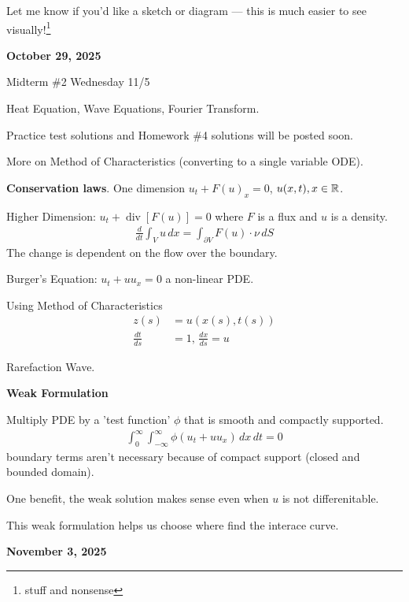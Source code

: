 \documentclass[12pt,a4paper]{report}
\begin{document}
Let me know if you'd like a sketch or diagram — this is much easier to see visually!\footnote{stuff and nonsense}{

\newpage
\textbf{\Large {October 29, 2025}}

\begin{description}
	\item Midterm \#2 Wednesday 11/5
	
	Heat Equation, Wave Equations, Fourier Transform.
	
	Practice test solutions and Homework \#4 solutions will be posted soon.
	
	\item More on Method of Characteristics (converting to a single variable ODE).
	
	\item \textbf{Conservation laws}. One dimension $ u_t + F(u)_x = 0 $, $u(x,t), x \in \mathbb{R}$.
	
	Higher Dimension: $u_t + \operatorname{div} [F(u)] = 0$ where $F$ is a flux and $u$ is a density.
	\begin{align*}
		\frac{d}{dt}\int_V u\, dx = \int_{\partial V} F(u)\cdot \nu\, dS
	\end{align*}The change is dependent on the flow over the boundary.
	
	Burger's Equation: $u_t + uu_x=0$ a non-linear PDE.
	
	Using Method of Characteristics
	\begin{align*}
		z(s) &= u(x(s), t(s)) \\
		\frac{dt}{ds} &= 1, \, \frac{dx}{ds} = u
	\end{align*}
	
	Rarefaction Wave.
	
	\item \textbf{Weak Formulation}
	
	Multiply PDE by a 'test function' $\phi$ that is smooth and compactly supported.
	\begin{align*}
		\int_0^\infty\int_{-\infty}^\infty \phi (u_t+uu_x)\, dx \, dt=0
	\end{align*}boundary terms aren't necessary because of compact support (closed and bounded domain).
	
	One benefit, the weak solution makes sense even when $u$ is not differenitable.
	
	This weak formulation helps us choose where find the interace curve.
\end{description}

\newpage
\textbf{\Large{November 3, 2025}}

}
\end{document}
